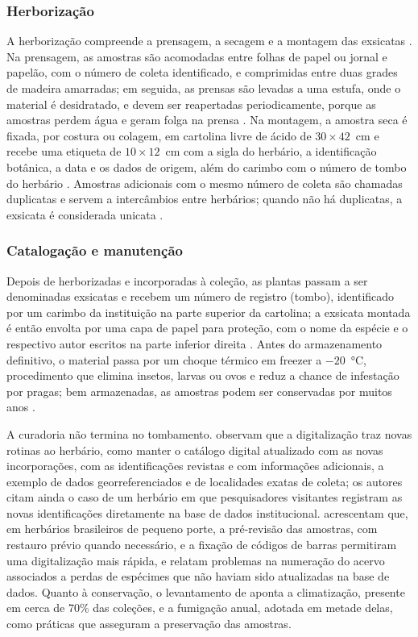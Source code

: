\documentclass[
    12pt,        %
    openany,     %
    oneside,     %
    a4paper,     %
    english,     %
    french,      %
    spanish,     %
    brazil,      %
    article      %
]{abntex2}
\begin{document}
\subsubsection{Herborização}

A herborização compreende a prensagem, a secagem e a montagem das exsicatas \cite{freitas2021coleta}. Na prensagem, as amostras são acomodadas entre folhas de papel ou jornal e papelão, com o número de coleta identificado, e comprimidas entre duas grades de madeira amarradas; em seguida, as prensas são levadas a uma estufa, onde o material é desidratado, e devem ser reapertadas periodicamente, porque as amostras perdem água e geram folga na prensa \cite{freitas2021coleta}. Na montagem, a amostra seca é fixada, por costura ou colagem, em cartolina livre de ácido de $30 \times 42$~cm e recebe uma etiqueta de $10 \times 12$~cm com a sigla do herbário, a identificação botânica, a data e os dados de origem, além do carimbo com o número de tombo do herbário \cite{freitas2021coleta}. Amostras adicionais com o mesmo número de coleta são chamadas duplicatas e servem a intercâmbios entre herbários; quando não há duplicatas, a exsicata é considerada unicata \cite{freitas2021coleta}.

\subsubsection{Catalogação e manutenção}

Depois de herborizadas e incorporadas à coleção, as plantas passam a ser denominadas exsicatas e recebem um número de registro (tombo), identificado por um carimbo da instituição na parte superior da cartolina; a exsicata montada é então envolta por uma capa de papel para proteção, com o nome da espécie e o respectivo autor escritos na parte inferior direita \cite{freitas2021coleta}. Antes do armazenamento definitivo, o material passa por um choque térmico em freezer a $-20$~°C, procedimento que elimina insetos, larvas ou ovos e reduz a chance de infestação por pragas; bem armazenadas, as amostras podem ser conservadas por muitos anos \cite{freitas2021coleta}.

A curadoria não termina no tombamento.  observam que a digitalização traz novas rotinas ao herbário, como manter o catálogo digital atualizado com as novas incorporações, com as identificações revistas e com informações adicionais, a exemplo de dados georreferenciados e de localidades exatas de coleta; os autores citam ainda o caso de um herbário em que pesquisadores visitantes registram as novas identificações diretamente na base de dados institucional.  acrescentam que, em herbários brasileiros de pequeno porte, a pré-revisão das amostras, com restauro prévio quando necessário, e a fixação de códigos de barras permitiram uma digitalização mais rápida, e relatam problemas na numeração do acervo associados a perdas de espécimes que não haviam sido atualizadas na base de dados. Quanto à conservação, o levantamento de  aponta a climatização, presente em cerca de 70\% das coleções, e a fumigação anual, adotada em metade delas, como práticas que asseguram a preservação das amostras.
\end{document}
